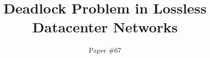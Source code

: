 \documentclass{sig-alternate-10pt}
\begin{document}

\title{Deadlock Problem in Lossless Datacenter Networks}
\author{Paper \#67}
\maketitle










\begin{small}


\end{small}
%
\end{document}
